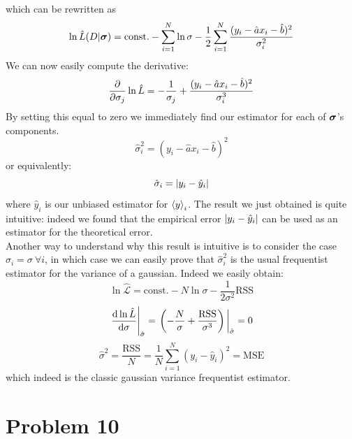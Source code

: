 \documentclass[a4paper]{article}
\newcommand{\tonde}[1]{\left( {#1} \right)}
\renewcommand{\L}{\mathcal{L}}%
\begin{document}
which can be rewritten as
\begin{equation}
    \ln\hat{L}(D|\vb*{\sigma}) = \text{const.} - \sum_{i=1}^N \ln \sigma - \frac{1}{2} \sum_{i=1}^N \frac{(y_i - \hat{a}x_i - \hat{b})^2}{\sigma_i^2}
\end{equation}
We can now easily compute the derivative:
\begin{equation*}
    \pdv{\sigma_j} \ln\hat{L} = -\frac{1}{\sigma_j} + \frac{(y_i - \hat{a}x_i - \hat{b})^2}{\sigma_i^3}
\end{equation*}
By setting this equal to zero we immediately find our estimator for each of $\vb*{\sigma}$'s components.
\begin{equation*}
    \hat{\sigma}_i^2 = (y_i - \hat{a}x_i - \hat{b})^2
\end{equation*}
or equivalently:
\begin{equation*}
    \hat{\sigma}_i = \abs{y_i - \hat{y}_i}
\end{equation*}
where $\hat{y}_i$ is our unbiased estimator for $\expval{y}_i$. The result we just obtained is quite intuitive: indeed we found that the empirical error $\abs{y_i - \hat{y}_i}$ can be used as an estimator for the theoretical error.\\
Another way to understand why this result is intuitive is to consider the case $\sigma_i = \sigma \ \forall i$, in which case we can easily prove that $\hat{\sigma}_i^2$ is the usual frequentist estimator for the variance of a gaussian. Indeed we easily obtain:
\begin{equation*}
    \ln\hat{\L} = \text{const.} - N\ln\sigma - \frac{1}{2\sigma^2}\text{RSS}
\end{equation*}
\begin{equation*}
    \eval{\dv{\ln\hat{L}}{\sigma}}_{\hat{\sigma}} = \eval{\tonde{-\frac{N}{\sigma} + \frac{\text{RSS}}{\sigma^3}}}_{\hat{\sigma}} = 0
\end{equation*}
\begin{equation*}
    \hat{\sigma}^2 = \frac{\text{RSS}}{N} = \frac{1}{N} \sum_{i=1}^N (y_i-\hat{y}_i)^2 = \text{MSE}
\end{equation*}
which indeed is the classic gaussian variance frequentist estimator.



\section{Problem 10}
\end{document}
